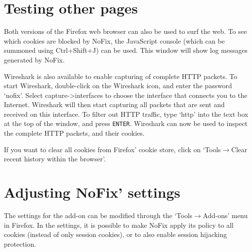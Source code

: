 \section{Testing other pages}

Both versions of the Firefox web browser can also be used to surf the web. To see which cookies are blocked by NoFix, the JavaScript console (which can be summoned using Ctrl+Shift+J) can be used. This window will show log messages generated by NoFix.

Wireshark is also available to enable capturing of complete HTTP packets. To start Wireshark, double-click on the Wireshark icon, and enter the password `nofix'. Select capture->interfaces to choose the interface that connects you to the Internet. Wireshark will then start capturing all packets that are sent and received on this interface. To filter out HTTP traffic, type `http' into the text box at the top of the window, and press \texttt{ENTER}. Wireshark can now be used to inspect the complete HTTP packets, and their cookies.

If you want to clear all cookies from Firefox' cookie store, click on `Tools$\rightarrow$Clear recent history within the browser'.

\section{Adjusting NoFix' settings}\label{settings}

The settings for the add-on can be modified through the `Tools$\rightarrow$Add-ons' menu in Firefox. In the settings, it is possible to make NoFix apply its policy to all cookies (instead of only session cookies), or to also enable session hijacking protection.
